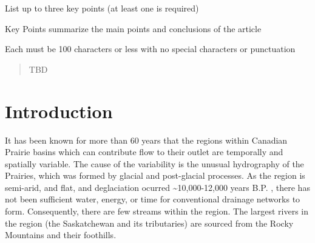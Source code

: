 \documentclass[draft,linenumbers]{agujournal2018}
\begin{document}




\begin{keypoints}
\item List up to three key points (at least one is required)
\item Key Points summarize the main points and conclusions of the article
\item Each must be 100 characters or less with no special characters or
punctuation
\end{keypoints}

%
%


\begin{abstract}
TBD
\end{abstract}
\section{Introduction}

It has been known for more than 60 years
\citep{stichlingDRAINAGEAREAHYDROLOGIC1957} that the regions within
Canadian Prairie basins which can contribute flow to their outlet are
temporally and spatially variable. The cause of the variability is the
unusual hydrography of the Prairies, which was formed by glacial and
post-glacial processes. As the region is semi-arid, and flat, and
deglaciation ocurred \textasciitilde{}10,000-12,000 years B.P.
\citep{christiansenWisconsinanDeglaciationSouthern1979}, there has not
been sufficient water, energy, or time for conventional drainage
networks to form. Consequently, there are few streams within the region.
The largest rivers in the region (the Saskatchewan and its tributaries)
are sourced from the Rocky Mountains and their foothills.
\end{document}
